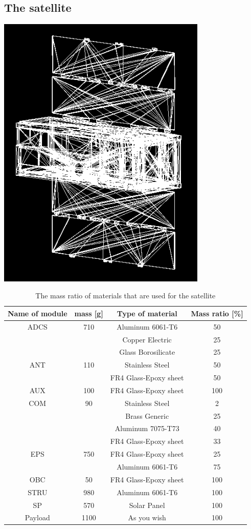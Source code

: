 \documentclass[12pt, a4paper,titlepage]{article}
\numberwithin{equation}{section}
\numberwithin{figure}{section}
\begin{document}
\subsection{The satellite}

\includegraphics[width=100.0mm]{images/satellite.png}

\begin{table}
\begin{center}
\begin{tabular}{ |c|c|c|c|} 
 \hline
 Name of module & mass [g] & Type of material & Mass ratio [\%]\\\hline
 ADCS &	710	& Aluminum 6061-T6 &	50\\
			& & Copper Electric	& 25 \\
			& &  Glass Borosilicate 	& 25\\\hline
ANT		&  110		& Stainless Steel 	& 50\\
		&  & FR4 Glass-Epoxy sheet	& 50\\\hline
AUX		& 100	& 	FR4 Glass-Epoxy sheet	& 100\\\hline
COM	& 	90	& 	Stainless Steel 	& 2\\
			& 	& Brass Generic		& 25\\
			& 	& Aluminum 7075-T73		& 40\\
			& 	& FR4 Glass-Epoxy sheet	& 	33\\\hline
EPS	& 	750	& 	FR4 Glass-Epoxy sheet		& 25\\
			& 	& Aluminum 6061-T6		& 75\\\hline
OBC	&	50		& FR4 Glass-Epoxy sheet	& 	100\\\hline
STRU	& 	980		& Aluminum 6061-T6	& 	100\\\hline
SP	& 	570		& Solar Panel	& 	100\\\hline
Payload	& 	1100	& 	As you wish	& 	100\\
 \hline
\end{tabular}
\end{center}
\caption{The mass ratio of materials that are used for the satellite}
\end{table}
\end{document}
